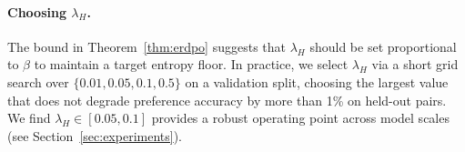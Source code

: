 \paragraph{Choosing $\lambda_H$.} The bound in Theorem~\ref{thm:erdpo} suggests that $\lambda_H$ should be set proportional to $\beta$ to maintain a target entropy floor. In practice, we select $\lambda_H$ via a short grid search over $\{0.01, 0.05, 0.1, 0.5\}$ on a validation split, choosing the largest value that does not degrade preference accuracy by more than 1\% on held-out pairs. We find $\lambda_H \in [0.05, 0.1]$ provides a robust operating point across model scales (see Section~\ref{sec:experiments}).

